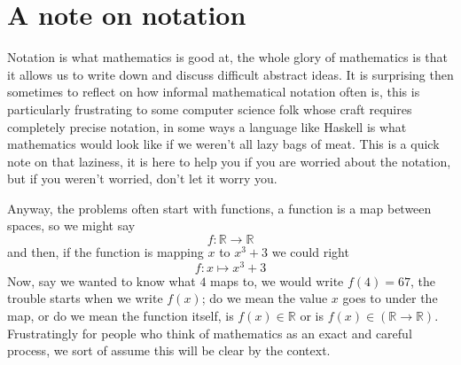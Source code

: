 \documentclass[12pt]{article}
\begin{document}
\section*{A note on notation}

Notation is what mathematics is good at, the whole glory of
mathematics is that it allows us to write down and discuss difficult
abstract ideas. It is surprising then sometimes to reflect on how
informal mathematical notation often is, this is particularly
frustrating to some computer science folk whose craft requires
completely precise notation, in some ways a language like Haskell is
what mathematics would look like if we weren't all lazy bags of
meat. This is a quick note on that laziness, it is here to help you if
you are worried about the notation, but if you weren't worried, don't
let it worry you.

Anyway, the problems often start with functions, a function is a map
between spaces, so we might say
\begin{equation}
  f:\mathbb{R}\rightarrow\mathbb{R}
\end{equation}
and then, if the function is mapping $x$ to $x^3+3$ we could right
\begin{equation}
  f:x\mapsto x^3+3
\end{equation}
Now, say we wanted to know what $4$ maps to, we would write $f(4)=67$,
the trouble starts when we write $f(x)$; do we mean the value $x$ goes
to under the map, or do we mean the function itself, is
$f(x)\in\mathbb{R}$ or is
$f(x)\in(\mathbb{R}\rightarrow\mathbb{R})$. Frustratingly for people
who think of mathematics as an exact and careful process, we sort of
assume this will be clear by the context.
\end{document}
